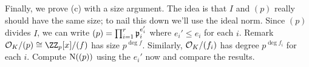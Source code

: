 \begin{problem}
\begin{sol}
	Finally, we prove (c) with a size argument.
		The idea is that $I$ and $(p)$ really should have the same size;
		to nail this down we'll use the ideal norm.
		Since $(p)$ divides $I$, we can write
		$ (p) = \prod_{i=1}^r \mathfrak p_i^{e_i'} $
		where $e_i' \le e_i$ for each $i$.
		Remark $\OO_K / (p) \cong \ZZ_p[x] / (f)$ has size $p^{\deg f}$.
		Similarly, $\mathcal O_K / (f_i)$ has degree $p^{\deg f_i}$ for each $i$.
		Compute $\operatorname{N}( (p) )$ using the $e_i'$ now and compare the results.
	\end{sol}
\end{problem}



